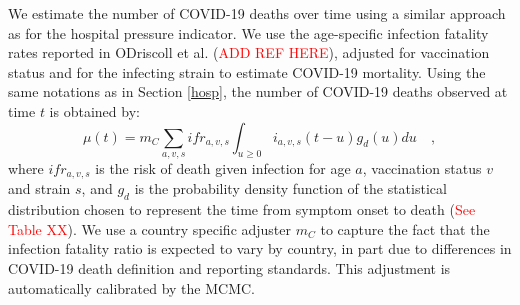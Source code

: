 We estimate the number of COVID-19 deaths over time using a similar approach 
as for the hospital pressure indicator. We use the age-specific infection fatality rates reported in
ODriscoll et al. (\textcolor{red}{ADD REF HERE}), adjusted for vaccination status and for the infecting strain
to estimate COVID-19 mortality. Using the same notations as in Section \ref{hosp}, the number of COVID-19
deaths observed at time $t$ is obtained by:
\begin{equation}
\mu(t) = m_C \sum_{a,v,s} ifr_{a,v,s} \int_{u \geq 0}  i_{a,v,s}(t-u)g_{d}(u) du   \quad,
\end{equation}
where $ifr_{a,v,s}$ is the risk of death given infection for age $a$, vaccination status $v$ and strain $s$, 
and $g_d$ is the probability density function of the statistical distribution chosen to represent the 
time from symptom onset to death (\textcolor{red}{See Table XX}). We use a country specific adjuster $m_C$ to 
capture the fact that the infection fatality ratio is expected to vary by country, in part due to 
differences in COVID-19 death definition and reporting standards. This adjustment is automatically calibrated 
by the MCMC.